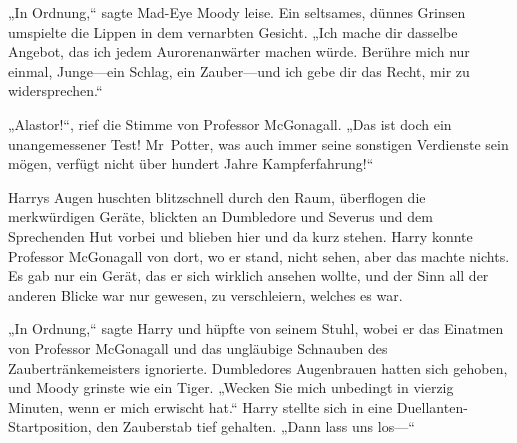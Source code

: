 „In Ordnung,“ sagte Mad-Eye Moody leise. Ein seltsames, dünnes Grinsen umspielte die Lippen in dem vernarbten Gesicht. „Ich mache dir dasselbe Angebot, das ich jedem Aurorenanwärter machen würde. Berühre mich nur einmal, Junge—ein Schlag, ein Zauber—und ich gebe dir das Recht, mir zu widersprechen.“

„Alastor!“, rief die Stimme von Professor McGonagall. „Das ist doch ein unangemessener Test! Mr~Potter, was auch immer seine sonstigen Verdienste sein mögen, verfügt nicht über hundert Jahre Kampferfahrung!“

Harrys Augen huschten blitzschnell durch den Raum, überflogen die merkwürdigen Geräte, blickten an Dumbledore und Severus und dem Sprechenden Hut vorbei und blieben hier und da kurz stehen. Harry konnte Professor McGonagall von dort, wo er stand, nicht sehen, aber das machte nichts. Es gab nur ein Gerät, das er sich wirklich ansehen wollte, und der Sinn all der anderen Blicke war nur gewesen, zu verschleiern, welches es war.

„In Ordnung,“ sagte Harry und hüpfte von seinem Stuhl, wobei er das Einatmen von Professor McGonagall und das ungläubige Schnauben des Zaubertränkemeisters ignorierte. Dumbledores Augenbrauen hatten sich gehoben, und Moody grinste wie ein Tiger. „Wecken Sie mich unbedingt in vierzig Minuten, wenn er mich erwischt hat.“
Harry stellte sich in eine Duellanten-Startposition, den Zauberstab tief gehalten.
„Dann lass uns los—“

